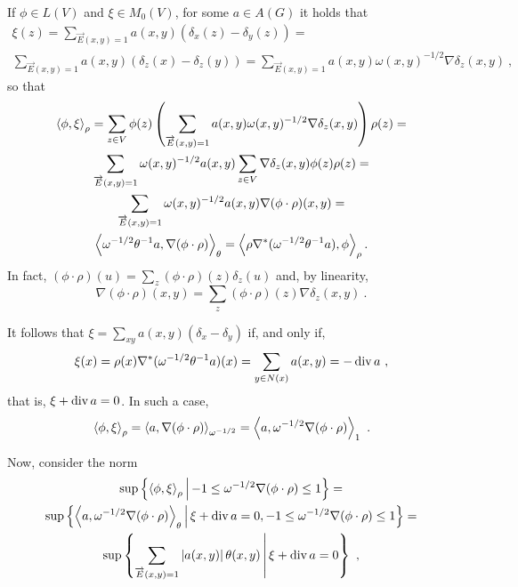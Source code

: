 \documentclass[12pt,a4paper]{amsart}
\theoremstyle{definition}
\begin{document}
If $\phi \in L(V)$ and $\xi \in M_0(V)$, for some $a \in A(G)$ it
holds that
\begin{multline*}
  \xi(z) =
  \sum_{\overrightarrow E(x,y)=1} a(x,y) (\delta_x(z) - \delta_y(z)) = \\
  \sum_{\overrightarrow E(x,y)=1} a(x,y) (\delta_z(x) - \delta_z(y)) =
  \sum_{\overrightarrow E(x,y)=1} a(x,y) \omega(x,y)^{-1/2} \nabla
  \delta_z (x,y) \ ,
\end{multline*}
so that
\begin{multline*}
  \scalarat \rho \phi \xi = \sum_{z \in V} \phi(z)
  \left(\sum_{\overrightarrow E(x,y)=1}
    a(x,y) \omega(x,y)^{-1/2} \nabla \delta_z (x,y)\right) \rho(z) = \\
  \sum_{\overrightarrow E(x,y)=1} \omega(x,y) ^{-1/2} a(x,y) \sum_{z
    \in V} \nabla \delta_z (x,y) \phi(z) \rho(z) = \\
  \sum_{\overrightarrow E(x,y)=1} \omega(x,y) ^{-1/2} a(x,y) \nabla
  (\phi \cdot \rho) (x,y) = \\ \scalarat \theta
  {\omega^{-1/2}\theta^{-1} a} {\nabla (\phi\cdot\rho)} = \scalarat
  \rho {\rho \nabla^* (\omega^{-1/2} \theta^{-1} a)} {\phi} .
\end{multline*}
In fact, $(\phi\cdot\rho)(u) = \sum_z (\phi\cdot\rho)(z) \delta_z(u)$ and,
by linearity,
\begin{equation*}
 \nabla (\phi\cdot\rho) (x,y) = \sum_z (\phi\cdot\rho)(z)
\nabla \delta_z(x,y) \ .
\end{equation*}


It follows that $\xi = \sum_{xy} a(x,y) (\delta_x-\delta_y)$ if, and
only if,
\begin{equation*}
  \xi(x) = \rho(x) \nabla^* (\omega^{-1/2} \theta^{-1} a) (x) = \sum_{y
    \in N(x)}  a(x,y) = - \Div a \ , 
\end{equation*}
that is, $\xi + \Div a = 0$. In such a case,
\begin{equation*}
  \scalarat \rho \phi \xi = \scalarat {\omega^{-1/2}} {a} {\nabla
    (\phi\cdot\rho)} = \scalarat 1 {a} {\omega^{-1/2} \nabla
    (\phi\cdot\rho)} \ .
\end{equation*}

Now, consider the norm
\begin{multline*}
  \sup\setof{\scalarat \rho \phi \xi}{-1 \leq \omega^{-1/2}
    \nabla(\phi\cdot\rho) \leq 1} = \\ \sup\setof{\scalarat \theta a
    {\omega^{-1/2} \nabla(\phi\cdot\rho)} }{\xi + \Div a = 0,
    -1 \leq \omega^{-1/2} \nabla(\phi\cdot\rho) \leq 1} = \\
  \sup\setof{\sum_{\overrightarrow E(x,y) = 1} \avalof{a(x,y)} \theta(x,y)}{\xi + \Div a = 0} \ ,
\end{multline*}
\end{document}
